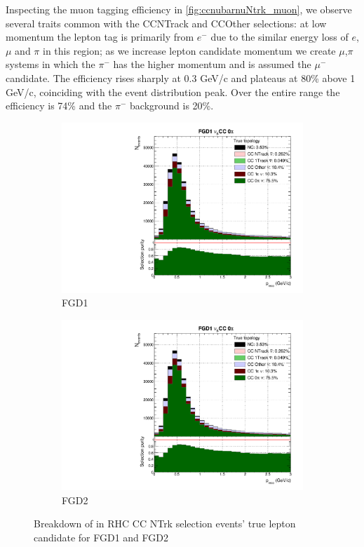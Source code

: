 Inspecting the muon tagging efficiency in \autoref{fig:ccnubarnuNtrk_muon}, we observe several traits common with the \numubar CCNTrack and \numu CCOther selections: at low momentum the lepton tag is primarily from $e^-$ due to the similar energy loss of $e$, $\mu$ and $\pi$ in this region; as we increase lepton candidate momentum we create $\mu$,$\pi$ systems in which the $\pi^-$ has the higher momentum and is assumed the $\mu^-$ candidate. The efficiency rises sharply at 0.3 GeV/c and plateaus at 80\% above 1 GeV/c, coinciding with the event distribution peak. Over the entire range the efficiency is 74\% and the $\pi^-$ background is 20\%.
\begin{figure}[h]
	\begin{subfigure}[t]{0.49\textwidth}
		\includegraphics[width=\textwidth,page=24, trim={0mm 0mm 0mm 9mm}, clip]{figures/mach3/selection/2017b_Diag_WithSelection}
		\caption{FGD1}
	\end{subfigure}
	\begin{subfigure}[t]{0.49\textwidth}
		\includegraphics[width=\textwidth,page=28, trim={0mm 0mm 0mm 9mm}, clip]{figures/mach3/selection/2017b_Diag_WithSelection}
		\caption{FGD2}
	\end{subfigure}
	\caption{Breakdown of \numu in RHC CC NTrk selection events' true lepton candidate for FGD1 and FGD2 }
	\label{fig:ccnubarnuNtrk_muon}
\end{figure}

